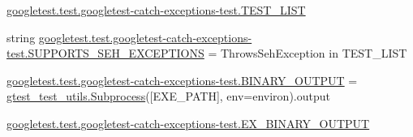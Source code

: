 \begin{DoxyCompactItemize}
\item 
\mbox{\hyperlink{namespacegoogletest_1_1test_1_1googletest-catch-exceptions-test_a6cafce1ac516550dfffe5d164b13e5a9}{googletest.\+test.\+googletest-\/catch-\/exceptions-\/test.\+T\+E\+S\+T\+\_\+\+L\+I\+ST}}
\item 
string \mbox{\hyperlink{namespacegoogletest_1_1test_1_1googletest-catch-exceptions-test_a603a95200c33cee520eb357d53e7b157}{googletest.\+test.\+googletest-\/catch-\/exceptions-\/test.\+S\+U\+P\+P\+O\+R\+T\+S\+\_\+\+S\+E\+H\+\_\+\+E\+X\+C\+E\+P\+T\+I\+O\+NS}} = \textquotesingle{}Throws\+Seh\+Exception\textquotesingle{} in T\+E\+S\+T\+\_\+\+L\+I\+ST
\item 
\mbox{\hyperlink{namespacegoogletest_1_1test_1_1googletest-catch-exceptions-test_a0f7774e8122b46eba43b2f4bc4442ca9}{googletest.\+test.\+googletest-\/catch-\/exceptions-\/test.\+B\+I\+N\+A\+R\+Y\+\_\+\+O\+U\+T\+P\+UT}} = \mbox{\hyperlink{classgtest__test__utils_1_1_subprocess}{gtest\+\_\+test\+\_\+utils.\+Subprocess}}(\mbox{[}E\+X\+E\+\_\+\+P\+A\+TH\mbox{]}, env=environ).output
\item 
\mbox{\hyperlink{namespacegoogletest_1_1test_1_1googletest-catch-exceptions-test_a0b8a12544418a059abfd895bbf7abe2e}{googletest.\+test.\+googletest-\/catch-\/exceptions-\/test.\+E\+X\+\_\+\+B\+I\+N\+A\+R\+Y\+\_\+\+O\+U\+T\+P\+UT}}
\end{DoxyCompactItemize}
